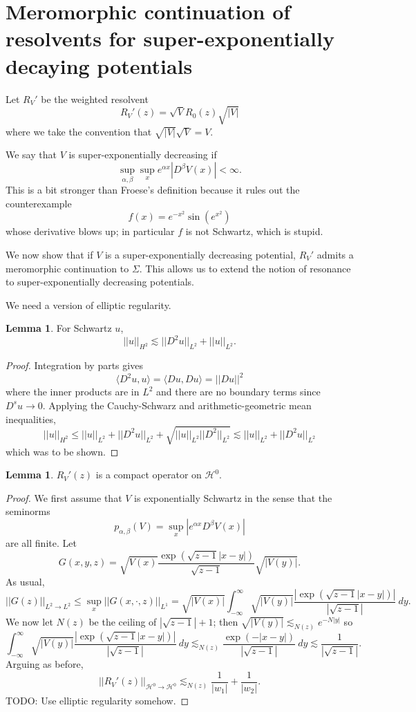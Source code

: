 \documentclass[12pt]{report}
\theoremstyle{definition}
\newtheorem{lemma}[theorem]{Lemma}
\begin{document}
\section{Meromorphic continuation of resolvents for super-exponentially decaying potentials}
Let $R_V'$ be the weighted resolvent
$$R_V'(z) = \sqrt V R_0(z) \sqrt{|V|}$$
where we take the convention that $\sqrt{|V|}\sqrt V = V$.

We say that $V$ is super-exponentially decreasing if
$$\sup_{\alpha,\beta} \sup_x e^{\alpha x}|D^\beta V(x)| < \infty.$$
This is a bit stronger than Froese's definition because it rules out the counterexample
$$f(x) = e^{-x^2} \sin(e^{x^2})$$
whose derivative blows up; in particular $f$ is not Schwartz, which is stupid.

We now show that if $V$ is a super-exponentially decreasing potential, $R_V'$ admits a meromorphic continuation to $\Sigma$. This allows us to extend the notion of resonance to super-exponentially decreasing potentials.

We need a version of elliptic regularity.
\begin{lemma}
For Schwartz $u$,
$$||u||_{H^2} \lesssim ||D^2u||_{L^2} + ||u||_{L^2}.$$
\end{lemma}
\begin{proof}
Integration by parts gives
$$\langle D^2 u, u\rangle = \langle Du, Du\rangle = ||Du||^2$$
where the inner products are in $L^2$ and there are no boundary terms since $D^su \to 0$. Applying the Cauchy-Schwarz and arithmetic-geometric mean inequalities,
$$||u||_{H^2} \leq ||u||_{L^2} + ||D^2u||_{L^2} + \sqrt{||u||_{L^2}||D^2||_{L^2}} \lesssim ||u||_{L^2} + ||D^2u||_{L^2}$$
which was to be shown.
\end{proof}

\begin{lemma}
$R_V'(z)$ is a compact operator on $\mathcal H^0$.
\end{lemma}
\begin{proof}
We first assume that $V$ is exponentially Schwartz in the sense that the seminorms
$$p_{\alpha,\beta}(V) = \sup_x |e^{\alpha x} D^\beta V(x)|$$
are all finite. Let
$$G(x, y, z) = \sqrt{V(x)}\frac{\exp(\sqrt{z-1}|x-y|)}{\sqrt{z-1}}\sqrt{|V(y)|}.$$
As usual,
$$||G(z)||_{L^2 \to L^2} \leq \sup_x ||G(x, \cdot, z)||_{L^1} = \sqrt{|V(x)|} \int_{-\infty}^\infty \sqrt{|V(y)|} \frac{|\exp(\sqrt{z-1}|x-y|)|}{|\sqrt{z-1}|}~dy.$$
We now let $N(z)$ be the ceiling of $|\sqrt{z-1}|+1$; then $\sqrt{|V(y)|} \lesssim_{N(z)} e^{-N|y|}$ so
$$\int_{-\infty}^\infty \sqrt{|V(y)|} \frac{|\exp(\sqrt{z-1}|x-y|)|}{|\sqrt{z-1}|}~dy \lesssim_{N(z)} \frac{\exp(-|x-y|)}{|\sqrt{z-1}|}~dy \lesssim \frac{1}{|\sqrt{z-1}|}.$$
Arguing as before,
$$||R_V'(z)||_{\mathcal H^0 \to \mathcal H^0} \lesssim_{N(z)} \frac{1}{|w_1|} + \frac{1}{|w_2|}.$$
TODO: Use elliptic regularity somehow.
\end{proof}
\end{document}
